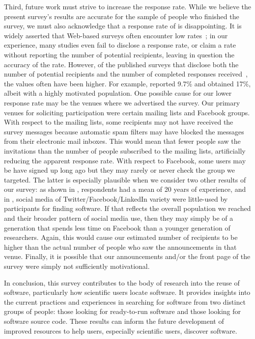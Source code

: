 \documentclass{casicswhitepaper}
\begin{document}
Third, future work must strive to increase the response rate.  While we believe the present survey's results are accurate for the sample of people who finished the survey, we must also acknowledge that a response rate of \populationResponseRate is disappointing.  It is widely asserted that Web-based surveys often encounter low rates~\cite[e.g.,][]{kitchenham_2008, couper2000review, couper2008web}; in our experience, many studies even fail to disclose a response rate, or claim a rate without reporting the number of potential recipients, leaving in question the accuracy of the rate.  However, of the published surveys that disclose both the number of potential recipients and the number of completed responses received~\cite[e.g.,][]{wu2007empirical, bauer2014exploratory, kalliamvakou_2014, lawrence2014who, sojer2010reusing}, the values often have been higher.  For example, \citet{sojer2010reusing} reported 9.7\% and \citet{lawrence2015science} obtained 17\%, albeit with a highly motivated population.  One possible cause for our lower response rate may be the venues where we advertised the survey.  Our primary venues for soliciting participation were certain mailing lists and Facebook groups.  With respect to the mailing lists, some recipients may not have received the survey messages because automatic spam filters may have blocked the messages from their electronic mail inboxes.  This would mean that fewer people saw the invitations than the number of people subscribed to the mailing lists, artificially reducing the apparent response rate.  With respect to Facebook, some users may be have signed up long ago but they may rarely or never check the group we targeted.  The latter is especially plausible when we consider two other results of our survey: as shown in , respondents had a mean of 20 years of experience, and in , social media of Twitter/Facebook/LinkedIn variety were little-used by participants for finding software.  If that reflects the overall population we reached and their broader pattern of social media use, then they may simply be of a generation that spends less time on Facebook than a younger generation of researchers.  Again, this would cause our estimated number of recipients to be higher than the actual number of people who saw the announcements in that venue.  Finally, it is possible that our announcements and/or the front page of the survey were simply not sufficiently motivational.

In conclusion, this survey contributes to the body of research into the reuse of software, particularly how scientific users locate software.  It provides insights into the current practices and experiences in searching for software from two distinct groups of people: those looking for ready-to-run software and those looking for software source code.  These results can inform the future development of improved resources to help users, especially scientific users, discover software.
\end{document}
